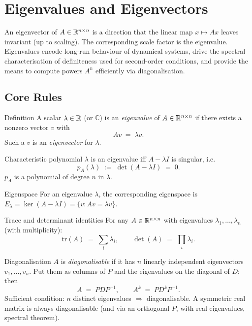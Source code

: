\chapter{Eigenvalues and Eigenvectors}

An eigenvector of $A \in \mathbb{R}^{n \times n}$ is a direction that the linear map
$x \mapsto A x$ leaves invariant (up to scaling). The corresponding scale
factor is the eigenvalue. Eigenvalues encode long-run behaviour of dynamical
systems, drive the spectral characterisation of definiteness used for
second-order conditions, and provide the means to compute powers $A^{n}$
efficiently via diagonalisation.

\section{Core Rules}

\begin{rulebox}{Definition}
A scalar $\lambda \in \mathbb{R}$ (or $\mathbb{C}$) is an \emph{eigenvalue} of
$A \in \mathbb{R}^{n \times n}$ if there exists a nonzero vector $v$ with
\[
A v \;=\; \lambda v.
\]
Such a $v$ is an \emph{eigenvector} for $\lambda$.
\end{rulebox}

\begin{rulebox}{Characteristic polynomial}
$\lambda$ is an eigenvalue iff $A - \lambda I$ is singular, i.e.\
\[
p_{A}(\lambda) \;:=\; \det(A - \lambda I) \;=\; 0.
\]
$p_{A}$ is a polynomial of degree $n$ in $\lambda$.
\end{rulebox}

\begin{rulebox}{Eigenspace}
For an eigenvalue $\lambda$, the corresponding eigenspace is
$E_{\lambda} = \ker(A - \lambda I) = \{v : A v = \lambda v\}$.
\end{rulebox}

\begin{rulebox}{Trace and determinant identities}
For any $A \in \mathbb{R}^{n \times n}$ with eigenvalues
$\lambda_{1}, \dots, \lambda_{n}$ (with multiplicity):
\[
\mathrm{tr}(A) \;=\; \sum_{i} \lambda_{i}, \qquad
\det(A) \;=\; \prod_{i} \lambda_{i}.
\]
\end{rulebox}

\begin{rulebox}{Diagonalisation}
$A$ is \emph{diagonalisable} if it has $n$ linearly independent eigenvectors
$v_{1}, \dots, v_{n}$. Put them as columns of $P$ and the eigenvalues on the
diagonal of $D$; then
\[
A \;=\; P D P^{-1}, \qquad A^{k} \;=\; P D^{k} P^{-1}.
\]
Sufficient condition: $n$ distinct eigenvalues $\Rightarrow$ diagonalisable.
A symmetric real matrix is always diagonalisable (and via an orthogonal $P$,
with real eigenvalues, spectral theorem).
\end{rulebox}

